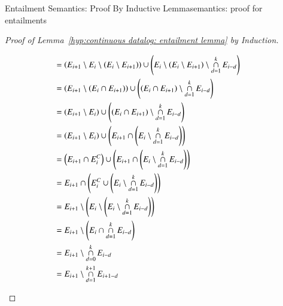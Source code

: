 \begin{nestedsection}{Entailment Semantics: Proof By Inductive Lemma}{semantics: proof for entailments}
\begin{proof}[Proof of Lemma~\ref{hyp:continuous datalog: entailment lemma} by Induction]
\begin{figure*}[p]
\begin{align*}
				& = \left( E_{i+1} \setminus E_{i} \setminus \left( E_{i} \setminus E_{i+1} \right) \right) \cup \left( E_{i} \setminus \left( E_{i} \setminus E_{i+1} \right) \setminus \mathop{\cap}^{k}_{d=1} E_{i-d} \right) \\
				& = \left( E_{i+1} \setminus \left( E_{i} \cap E_{i+1} \right) \right) \cup \left( \left( E_{i} \cap E_{i+1} \right) \setminus \mathop{\cap}^{k}_{d=1} E_{i-d} \right) \\
				& = \left( E_{i+1} \setminus E_{i} \right) \cup \left( \left( E_{i} \cap E_{i+1} \right) \setminus \mathop{\cap}^{k}_{d=1} E_{i-d} \right) \\
				& = \left( E_{i+1} \setminus E_{i} \right) \cup \left( E_{i+1} \cap \left( E_{i} \setminus \mathop{\cap}^{k}_{d=1} E_{i-d} \right) \right) \\
				& = \left( E_{i+1} \cap E^C_{i} \right) \cup \left( E_{i+1} \cap \left( E_{i} \setminus \mathop{\cap}^{k}_{d=1} E_{i-d} \right) \right)\\
				& = E_{i+1} \cap \left( E^C_{i} \cup \left( E_{i} \setminus \mathop{\cap}^{k}_{d=1} E_{i-d} \right) \right) \\
				& = E_{i+1} \setminus \left( E_{i} \setminus \left( E_{i} \setminus \mathop{\cap}^{k}_{d=1} E_{i-d} \right) \right) \\
				& = E_{i+1} \setminus \left( E_{i} \cap \mathop{\cap}^{k}_{d=1} E_{i-d} \right) \\
				& = E_{i+1} \setminus \mathop{\cap}^{k}_{d=0} E_{i-d} \\
				& = E_{i+1} \setminus \mathop{\cap}^{k+1}_{d=1} E_{i+1-d} && \qedhere
			\end{align*}
		\end{figure*}
	\end{proof}
\end{nestedsection}